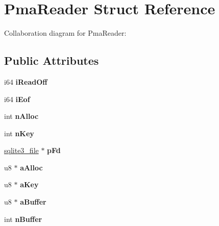 \hypertarget{structPmaReader}{}\section{Pma\+Reader Struct Reference}
\label{structPmaReader}


Collaboration diagram for Pma\+Reader\+:
\subsection*{Public Attributes}
\begin{DoxyCompactItemize}
\item 
i64 {\bfseries i\+Read\+Off}\hypertarget{structPmaReader_a04a9b631060dcda1d94eb7b16ef8920e}{}\label{structPmaReader_a04a9b631060dcda1d94eb7b16ef8920e}

\item 
i64 {\bfseries i\+Eof}\hypertarget{structPmaReader_a7a2e2745d054cd6d86e1ad57d641b657}{}\label{structPmaReader_a7a2e2745d054cd6d86e1ad57d641b657}

\item 
int {\bfseries n\+Alloc}\hypertarget{structPmaReader_a82522a9128afb8bfb79b88a7c51726ef}{}\label{structPmaReader_a82522a9128afb8bfb79b88a7c51726ef}

\item 
int {\bfseries n\+Key}\hypertarget{structPmaReader_a02c5dbf65efa252a84259b1ee2a7cd3c}{}\label{structPmaReader_a02c5dbf65efa252a84259b1ee2a7cd3c}

\item 
\hyperlink{structsqlite3__file}{sqlite3\+\_\+file} $\ast$ {\bfseries p\+Fd}\hypertarget{structPmaReader_a1ae1caa6e4b1900937135aeeaf1336cd}{}\label{structPmaReader_a1ae1caa6e4b1900937135aeeaf1336cd}

\item 
u8 $\ast$ {\bfseries a\+Alloc}\hypertarget{structPmaReader_af8d5ac60d1ba7ff84e84d5eb6aba4447}{}\label{structPmaReader_af8d5ac60d1ba7ff84e84d5eb6aba4447}

\item 
u8 $\ast$ {\bfseries a\+Key}\hypertarget{structPmaReader_af8f5dbc63cbbcbf9ee4c2c462ab1c6ff}{}\label{structPmaReader_af8f5dbc63cbbcbf9ee4c2c462ab1c6ff}

\item 
u8 $\ast$ {\bfseries a\+Buffer}\hypertarget{structPmaReader_acd2a7f3e0375a3f8dfa9e565d080e2c2}{}\label{structPmaReader_acd2a7f3e0375a3f8dfa9e565d080e2c2}

\item 
int {\bfseries n\+Buffer}\hypertarget{structPmaReader_a422d021b0509c7e5eb2938bba36a5cdd}{}\label{structPmaReader_a422d021b0509c7e5eb2938bba36a5cdd}


\end{DoxyCompactItemize}
